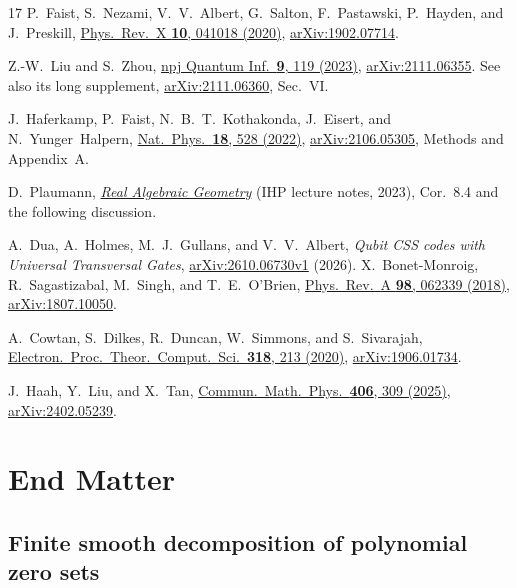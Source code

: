 \documentclass[aps,prl,reprint,notitlepage,nofootinbib,nobibnotes]{revtex4-2}
\begin{document}
\begin{thebibliography}{17}
P.~Faist, S.~Nezami, V.~V.~Albert, G.~Salton, F.~Pastawski,
P.~Hayden, and J.~Preskill,
\href{https://doi.org/10.1103/PhysRevX.10.041018}
{Phys.\ Rev.\ X \textbf{10}, 041018 (2020)},
\href{https://arxiv.org/abs/1902.07714}{arXiv:1902.07714}.

Z.-W.~Liu and S.~Zhou,
\href{https://doi.org/10.1038/s41534-023-00788-4}
{npj Quantum Inf.\ \textbf{9}, 119 (2023)},
\href{https://arxiv.org/abs/2111.06355}{arXiv:2111.06355}.
See also its long supplement,
\href{https://arxiv.org/abs/2111.06360}{arXiv:2111.06360}, Sec.~VI.

J.~Haferkamp, P.~Faist, N.~B.~T.~Kothakonda, J.~Eisert, and
N.~Yunger~Halpern,
\href{https://doi.org/10.1038/s41567-022-01539-6}
{Nat.\ Phys.\ \textbf{18}, 528 (2022)},
\href{https://arxiv.org/abs/2106.05305}{arXiv:2106.05305},
Methods and Appendix~A.

D.~Plaumann,
\href{https://wwwold.mathematik.tu-dortmund.de/~dplauman/notes/rag-ihp.pdf}
{\emph{Real Algebraic Geometry}}
(IHP lecture notes, 2023), Cor.~8.4 and the following discussion.

A.~Dua, A.~Holmes, M.~J.~Gullans, and V.~V.~Albert,
\emph{Qubit CSS codes with Universal Transversal Gates},
\href{https://arxiv.org/abs/2610.06730v1}{arXiv:2610.06730v1} (2026).
X.~Bonet-Monroig, R.~Sagastizabal, M.~Singh, and T.~E.~O'Brien,
\href{https://doi.org/10.1103/PhysRevA.98.062339}
{Phys.\ Rev.\ A \textbf{98}, 062339 (2018)},
\href{https://arxiv.org/abs/1807.10050}{arXiv:1807.10050}.

A.~Cowtan, S.~Dilkes, R.~Duncan, W.~Simmons, and S.~Sivarajah,
\href{https://doi.org/10.4204/EPTCS.318.13}
{Electron.\ Proc.\ Theor.\ Comput.\ Sci.\ \textbf{318}, 213 (2020)},
\href{https://arxiv.org/abs/1906.01734}{arXiv:1906.01734}.

J.~Haah, Y.~Liu, and X.~Tan,
\href{https://doi.org/10.1007/s00220-025-05480-6}
{Commun.\ Math.\ Phys.\ \textbf{406}, 309 (2025)},
\href{https://arxiv.org/abs/2402.05239}{arXiv:2402.05239}.

\end{thebibliography}

\section*{End Matter}
\subsection*{Finite smooth decomposition of polynomial zero sets}
\end{document}
